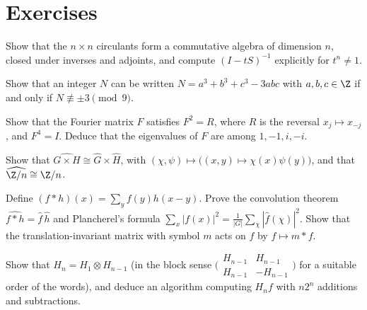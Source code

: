 \section{Exercises}

\begin{exercise}[$\star$]\label{linear:ex:circalg}
Show that the $n\times n$ circulants form a commutative algebra of dimension $n$, closed under inverses and adjoints, and
compute $(I-tS)^{-1}$ explicitly for $t^n\ne1$.
\end{exercise}

\begin{exercise}[$\star\star$]\label{linear:ex:circ3}
Show that an integer $N$ can be written $N=a^3+b^3+c^3-3abc$ with $a,b,c\in\Z$ if and only if $N\not\equiv\pm3\pmod9$.
\end{exercise}

\begin{exercise}[$\star$]\label{linear:ex:fourier}
Show that the Fourier matrix $F$ satisfies $F^2=R$, where $R$ is the reversal $x_j\mapsto x_{-j}$, and $F^4=I$. Deduce that the
eigenvalues of $F$ are among $1,-1,i,-i$.
\end{exercise}

\begin{exercise}[$\star$]\label{linear:ex:dualgroup}
Show that $\widehat{G\times H}\cong\widehat G\times\widehat H$, with $(\chi,\psi)\mapsto\bigl((x,y)\mapsto\chi(x)\psi(y)\bigr)$, and that
$\widehat{\Z/n}\cong\Z/n$.
\end{exercise}

\begin{exercise}[$\star\star$]\label{linear:ex:convolution}
Define $(f*h)(x)=\sum_yf(y)h(x-y)$. Prove the convolution theorem $\widehat{f*h}=\hat f\,\hat h$ and Plancherel's formula
$\sum_x|f(x)|^2=\frac1{|G|}\sum_\chi|\hat f(\chi)|^2$. Show that the translation-invariant matrix with symbol $m$ acts on $f$ by
$f\mapsto m*f$.
\end{exercise}

\begin{exercise}[$\star\star$]\label{linear:ex:walsh}
Show that $H_n=H_1\otimes H_{n-1}$ (in the block sense $\bigl(\begin{smallmatrix}H_{n-1}&H_{n-1}\\H_{n-1}&-H_{n-1}\end{smallmatrix}\bigr)$
for a suitable order of the words), and deduce an algorithm computing $H_nf$ with $n2^n$ additions and subtractions.
\end{exercise}

